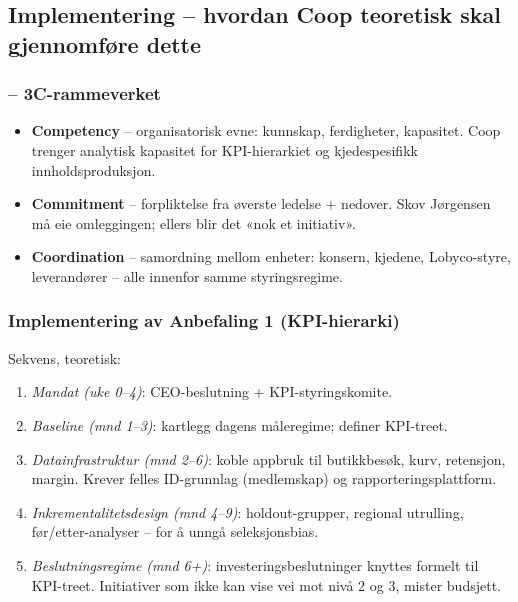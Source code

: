 \subsection{Implementering -- hvordan Coop teoretisk skal gjennomføre dette}

\subsubsection*{ -- 3C-rammeverket}
\begin{itemize}
  \item \textbf{Competency} -- organisatorisk evne: kunnskap, ferdigheter,
    kapasitet. Coop trenger analytisk kapasitet for KPI-hierarkiet og
    kjedespesifikk innholdsproduksjon.
  \item \textbf{Commitment} -- forpliktelse fra øverste ledelse + nedover.
    Skov Jørgensen må eie omleggingen; ellers blir det «nok et initiativ».
  \item \textbf{Coordination} -- samordning mellom enheter: konsern,
    kjedene, Lobyco-styre, leverandører -- alle innenfor samme
    styringsregime.
\end{itemize}

\subsubsection*{Implementering av Anbefaling 1 (KPI-hierarki)}
Sekvens, teoretisk:
\begin{enumerate}
  \item \emph{Mandat (uke 0--4)}: CEO-beslutning + KPI-styringskomite.
  \item \emph{Baseline (mnd 1--3)}: kartlegg dagens måleregime; definer
    KPI-treet.
  \item \emph{Datainfrastruktur (mnd 2--6)}: koble appbruk til butikkbesøk,
    kurv, retensjon, margin. Krever felles ID-grunnlag (medlemskap) og
    rapporteringsplattform.
  \item \emph{Inkrementalitetsdesign (mnd 4--9)}: holdout-grupper, regional
    utrulling, før/etter-analyser -- for å unngå seleksjonsbias.
  \item \emph{Beslutningsregime (mnd 6+)}: investeringsbeslutninger knyttes
    formelt til KPI-treet. Initiativer som ikke kan vise vei mot nivå 2 og
    3, mister budsjett.
\end{enumerate}


